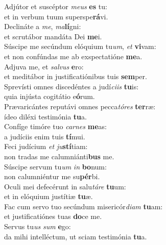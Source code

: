 \evenverse Adjútor et suscéptor \textit{me}\textit{us} \textbf{es} tu:~\*\\
\evenverse et in verbum tuum superspe\textbf{rá}vi.\\
\oddverse Declináte a \textit{me}, \textit{ma}\textbf{lí}gni:~\*\\
\oddverse et scrutábor mandáta Dei \textbf{me}i.\\
\evenverse Súscipe me secúndum elóquium tu\textit{um}, \textit{et} \textbf{vi}vam:~\*\\
\evenverse et non confúndas me ab exspectatióne \textbf{me}a.\\
\oddverse Adjuva me, et \textit{sal}\textit{vus} \textbf{e}ro:~\*\\
\oddverse et meditábor in justificatiónibus tuis \textbf{sem}per.\\
\evenverse Sprevísti omnes discedéntes a judí\textit{ci}\textit{is} \textbf{tu}is:~\*\\
\evenverse quia injústa cogitátio e\textbf{ó}rum.\\
\oddverse Prævaricántes reputávi omnes pecca\textit{tó}\textit{res} \textbf{ter}ræ:~\*\\
\oddverse ídeo diléxi testimónia \textbf{tu}a.\\
\evenverse Confíge timóre tuo \textit{car}\textit{nes} \textbf{me}as:~\*\\
\evenverse a judíciis enim tuis \textbf{tí}mui.\\
\oddverse Feci judícium \textit{et} \textit{ju}\textbf{stí}tiam:~\*\\
\oddverse non tradas me calumniánti\textbf{bus} me.\\
\evenverse Súscipe servum tu\textit{um} \textit{in} \textbf{bo}num:~\*\\
\evenverse non calumniéntur me su\textbf{pér}bi.\\
\oddverse Oculi mei defecérunt in salu\textit{tá}\textit{re} \textbf{tu}um:~\*\\
\oddverse et in elóquium justítiæ \textbf{tu}æ.\\
\evenverse Fac cum servo tuo secúndum misericór\textit{di}\textit{am} \textbf{tu}am:~\*\\
\evenverse et justificatiónes tuas \textbf{do}ce me.\\
\oddverse Servus tu\textit{us} \textit{sum} \textbf{e}go:~\*\\
\oddverse da mihi intelléctum, ut sciam testimónia \textbf{tu}a.\\
